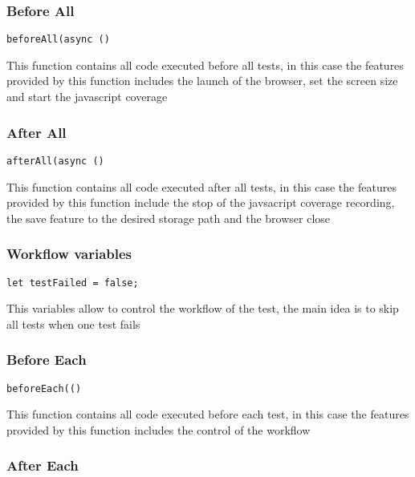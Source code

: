 \documentclass[a4paper]{article}
\begin{document}
\hypertarget{toc110}{}
\subsubsection{Before All}

\begin{lstlisting}
beforeAll(async ()
\end{lstlisting}

This function contains all code executed before all tests, in this case the
features provided by this function includes the launch of the browser, set
the screen size and start the javascript coverage

\hypertarget{toc111}{}
\subsubsection{After All}

\begin{lstlisting}
afterAll(async ()
\end{lstlisting}

This function contains all code executed after all tests, in this case the
features provided by this function include the stop of the javsacript coverage
recording, the save feature to the desired storage path and the browser close

\hypertarget{toc112}{}
\subsubsection{Workflow variables}

\begin{lstlisting}
let testFailed = false;
\end{lstlisting}

This variables allow to control the workflow of the test, the main idea is to
skip all tests when one test fails

\hypertarget{toc113}{}
\subsubsection{Before Each}

\begin{lstlisting}
beforeEach(()
\end{lstlisting}

This function contains all code executed before each test, in this case the
features provided by this function includes the control of the workflow

\hypertarget{toc114}{}
\subsubsection{After Each}
\end{document}
